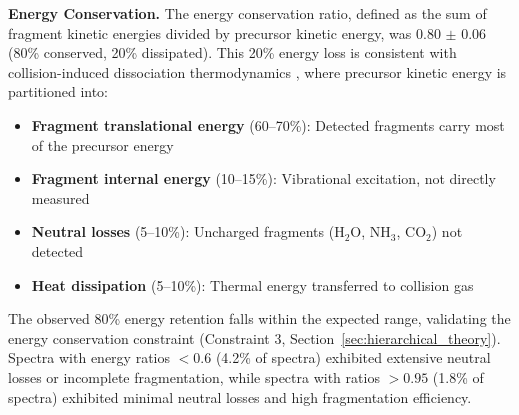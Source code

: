 \documentclass[11pt,twocolumn]{article}
\begin{document}
\textbf{Energy Conservation.} The energy conservation ratio, defined as the sum of fragment kinetic energies divided by precursor kinetic energy, was 0.80 $\pm$ 0.06 (80\% conserved, 20\% dissipated). This 20\% energy loss is consistent with collision-induced dissociation thermodynamics \cite{sleno2004ion}, where precursor kinetic energy is partitioned into:
\begin{itemize}[leftmargin=*]
    \item \textbf{Fragment translational energy} (60--70\%): Detected fragments carry most of the precursor energy
    \item \textbf{Fragment internal energy} (10--15\%): Vibrational excitation, not directly measured
    \item \textbf{Neutral losses} (5--10\%): Uncharged fragments (H$_2$O, NH$_3$, CO$_2$) not detected
    \item \textbf{Heat dissipation} (5--10\%): Thermal energy transferred to collision gas
\end{itemize}
The observed 80\% energy retention falls within the expected range, validating the energy conservation constraint (Constraint 3, Section~\ref{sec:hierarchical_theory}). Spectra with energy ratios $< 0.6$ (4.2\% of spectra) exhibited extensive neutral losses or incomplete fragmentation, while spectra with ratios $> 0.95$ (1.8\% of spectra) exhibited minimal neutral losses and high fragmentation efficiency.
\end{document}
